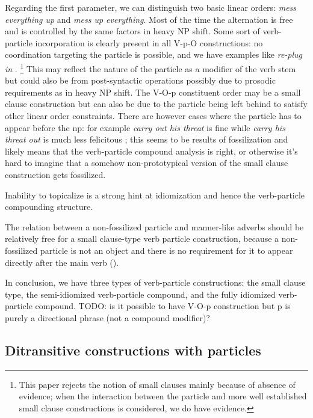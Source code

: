 \documentclass[UTF8, a4paper, oneside, scheme=plain, 12pt]{ctexbook}
\newcommand*{\citepage}[1]{p.~{#1}}
\newcommand{\form}[1]{\emph{#1}}
\begin{document}
Regarding the first parameter, we can distinguish two basic linear orders:
\form{mess everything up} and \form{mess up everything}.
Most of the time the alternation is free and is controlled by the same factors in heavy NP shift.
Some sort of verb-particle incorporation is clearly present in all V-p-O constructions:
no coordination targeting the particle is possible, 
and we have examples like \form{re-plug in} \citep{farrell2005english}.%
\footnote{
    This paper rejects the notion of small clauses mainly because of absence of evidence; 
    when the interaction between the particle and more well established small clause constructions is considered, we do have evidence.
}
This may reflect the nature of the particle as a modifier of the verb stem
but could also be from post-syntactic operations 
possibly due to prosodic requirements as in heavy NP shift. 
The V-O-p constituent order may be a small clause construction 
but can also be due to the particle being left behind to satisfy other linear order constraints.
There are however cases where the particle has to appear before the \acs{np}:
for example \form{carry out his threat} is fine 
while \form{carry his threat out} is much less felicitous \citep[\citepage{285}]{cgel};
this seems to be results of fossilization 
and likely means that the verb-particle compound analysis is right, 
or otherwise it's hard to imagine that 
a somehow non-prototypical version of the small clause construction gets fossilized.

Inability to topicalize is a strong hint at idiomization and hence the verb-particle compounding structure.

The relation between a non-fossilized particle and manner-like adverbs 
should be relatively free for a small clause-type verb particle construction, 
because a non-fossilized particle is not an object 
and there is no requirement for it to appear directly after the main verb 
().

In conclusion, we have three types of verb-particle constructions: 
the small clause type, the semi-idiomized verb-particle compound, 
and the fully idiomized verb-particle compound.
TODO: is it possible to have V-O-p construction but p is purely a directional phrase (not a compound modifier)?

\subsection{Ditransitive constructions with particles}\label{sec:clause.ditransitive-particle}
\end{document}
